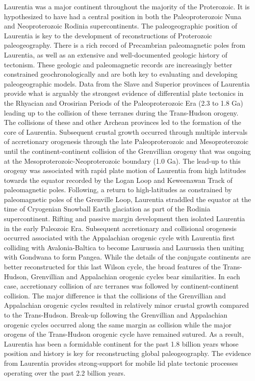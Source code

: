 \documentclass[11pt,letterpaper]{article}
\begin{document}
Laurentia was a major continent throughout the majority of the Proterozoic. It is hypothesized to have had a central position in both the Paleoproterozoic Nuna and Neoproterozoic Rodinia supercontinents. The paleogeographic position of Laurentia is key to the development of reconstructions of Proterozoic paleogeography. There is a rich record of Precambrian paleomagnetic poles from Laurentia, as well as an extensive and well-documented geologic history of tectonism. These geologic and paleomagnetic records are increasingly better constrained geochronologically and are both key to evaluating and developing paleogeographic models. Data from the Slave and Superior provinces of Laurentia provide what is arguably the strongest evidence of differential plate tectonics in the Rhyacian and Orosirian Periods of the Paleoproterozoic Era (2.3 to 1.8 Ga) leading up to the collision of these terranes during the Trans-Hudson orogeny. The collisions of these and other Archean provinces led to the formation of the core of Laurentia. Subsequent crustal growth occurred through multiple intervals of accretionary orogenesis through the late Paleoproterozoic and Mesoproterozoic until the continent-continent collision of the Grenvillian orogeny that was ongoing at the Mesoproterozoic-Neoproterozoic boundary (1.0 Ga). The lead-up to this orogeny was associated with rapid plate motion of Laurentia from high latitudes towards the equator recorded by the Logan Loop and Keweenawan Track of paleomagnetic poles. Following, a return to high-latitudes as constrained by paleomagnetic poles of the Grenville Loop, Laurentia straddled the equator at the time of Cryogenian Snowball Earth glaciation as part of the Rodinia supercontinent. Rifting and passive margin development then isolated Laurentia in the early Paleozoic Era. Subsequent accretionary and collisional orogenesis occurred associated with the Appalachian orogenic cycle with Laurentia first colliding with Avalonia-Baltica to become Laurussia and Laurussia then uniting with Gondwana to form Pangea. While the details of the conjugate continents are better reconstructed for this last Wilson cycle, the broad features of the Trans-Hudson, Grenvillian and Appalachian orogenic cycles bear similarities. In each case, accretionary collision of arc terranes was followed by continent-continent collision. The major difference is that the collisions of the Grenvillian and Appalachian orogenic cycles resulted in relatively minor crustal growth compared to the Trans-Hudson. Break-up following the Grenvillian and Appalachian orogenic cycles occurred along the same margin as collision while the major orogens of the Trans-Hudson orogenic cycle have remained sutured. As a result, Laurentia has been a formidable continent for the past 1.8 billion years whose position and history is key for reconstructing global paleogeography. The evidence from Laurentia provides strong-support for mobile lid plate tectonic processes operating over the past 2.2 billion years.
\end{document}
